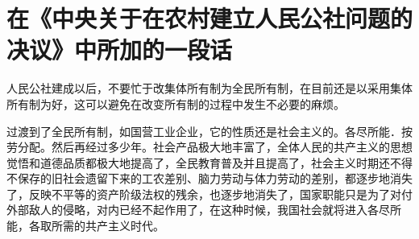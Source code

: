 \section[在《中央关于在农村建立人民公社问题的决议》中所加的一段话（一九五八年八月）]{在《中央关于在农村建立人民公社问题的决议》中所加的一段话}


人民公社建成以后，不要忙于改集体所有制为全民所有制，在目前还是以采用集体所有制为好，这可以避免在改变所有制的过程中发生不必要的麻烦。

过渡到了全民所有制，如国营工业企业，它的性质还是社会主义的。各尽所能．按劳分配。然后再经过多少年。社会产品极大地丰富了，全体人民的共产主义的思想觉悟和道德品质都极大地提高了，全民教育普及并且提高了，社会主义时期还不得不保存的旧社会遗留下来的工农差别、脑力劳动与体力劳动的差别，都逐步地消失了，反映不平等的资产阶级法权的残余，也逐步地消失了，国家职能只是为了对付外部敌人的侵略，对内已经不起作用了，在这种时候，我国社会就将进入各尽所能，各取所需的共产主义时代。


